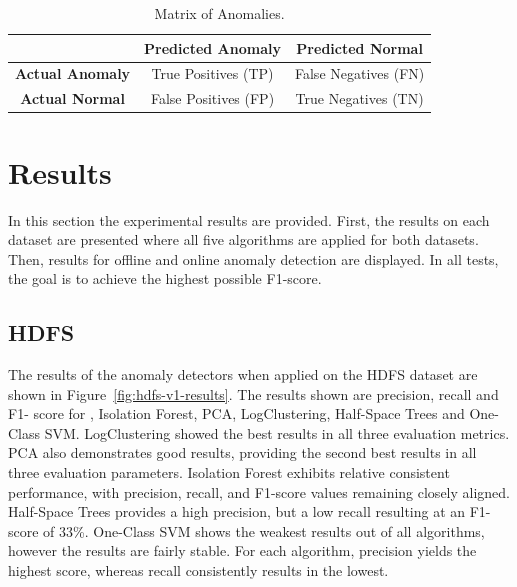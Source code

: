 \begin{table}[t]
\centering
{}
\begin{tabular}{|c|c|c|}
\hline
 & \textbf{Predicted Anomaly} & \textbf{Predicted Normal} \\
\hline
\textbf{Actual Anomaly} & True Positives (TP) & False Negatives (FN) \\
\hline
\textbf{Actual Normal} & False Positives (FP) & True Negatives (TN) \\
\hline
\end{tabular}
\caption{Matrix of Anomalies.}
\label{tab:anomaly_matrix}
\end{table}

\section{Results}
In this section the experimental results are provided. First, the results on each dataset are presented where all five algorithms are applied for both datasets. Then, results for offline and online anomaly detection are displayed. In all tests, the goal is to achieve the highest possible F1-score.

\subsection{HDFS} 
The results of the anomaly detectors when applied on the HDFS dataset are shown in Figure~\ref{fig:hdfs-v1-results}. The results shown are precision, recall and F1- score for , Isolation Forest, PCA, LogClustering, Half-Space Trees and One-Class SVM.  LogClustering showed the best results in all three evaluation metrics. PCA also demonstrates good results, providing the second best results in all three evaluation parameters. Isolation Forest exhibits relative consistent performance, with precision, recall, and F1-score values remaining closely aligned. Half-Space Trees provides a high precision, but a low recall resulting at an F1-score of $33$\%. One-Class SVM shows the weakest results out of all algorithms, however the results are fairly stable. For each algorithm, precision yields the highest score, whereas recall consistently results in the lowest.

